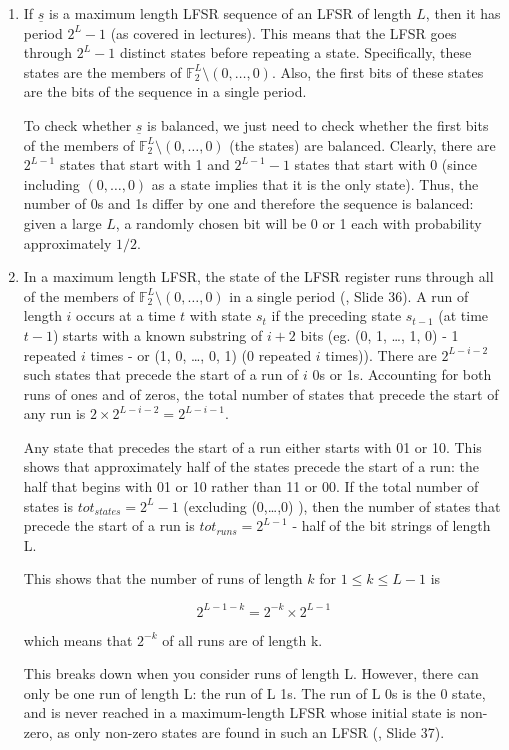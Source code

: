 \begin{enumerate}

\item If $\underline{s}$ is a maximum length LFSR sequence of an LFSR of length
$L$, then it has period $2^L-1$ (as covered in lectures). This means that the
LFSR goes through $2^L-1$ distinct states before repeating a state.
Specifically, these states are the members of $\mathbb{F}_2^L \setminus
{(0,\dots,0)}$. Also, the first bits of these states are the bits of the
sequence in a single period.

To check whether $\underline{s}$ is balanced, we just need to check whether the
first bits of the members of $\mathbb{F}_2^L \setminus {(0,\dots,0)}$ (the
states) are balanced. Clearly, there are $2^{L-1}$ states that start with 1 and
$2^{L-1}-1$ states that start with 0 (since including $(0,\dots,0)$ as a state
implies that it is the only state). Thus, the number of 0s and 1s differ by one
and therefore the sequence is balanced: given a large $L$, a randomly chosen bit
will be 0 or 1 each with probability approximately $1/2$.

\item In a maximum length LFSR, the state of the LFSR register runs through all
of the members of $\mathbb{F}_2^L \setminus {(0,\dots,0)}$ in a single period
(\cite{slides}, Slide 36). A run of length $i$ occurs at a time $t$ with state
$s_t$ if the preceding state $s_{t-1}$ (at time $t-1$) starts with a known
substring of $i+2$ bits (eg. (0, 1, \dots, 1, 0) - 1 repeated $i$ times - or (1,
0, \dots, 0, 1) (0 repeated $i$ times)). There are $2^{L-i-2}$ such states that
precede the start of a run of $i$ 0s or 1s. Accounting for both runs of ones and
of zeros, the total number of states that precede the start of any run is $2
\times 2^{L-i-2} = 2^{L-i-1}$.

Any state that precedes the start of a run either starts with 01 or 10. This
shows that approximately half of the states precede the start of a run: the half
that begins with 01 or 10 rather than 11 or 00. If the total number of states is
$tot_{states} = 2^L-1$ (excluding (0,\dots,0) ), then the number of states that
precede the start of a run is $tot_{runs} = 2^{L-1}$ - half of the bit strings
of length L.

This shows that the number of runs of length $k$ for $1 \le k \le L-1$ is

\[2^{L-1-k} = 2^{-k} \times 2^{L-1}\]

which means that $2^{-k}$ of all runs are of length k.

This breaks down when you consider runs of length L. However, there can only be
one run of length L: the run of L 1s. The run of L 0s is the 0 state, and is
never reached in a maximum-length LFSR whose initial state is non-zero, as only
non-zero states are found in such an LFSR (\cite{slides}, Slide 37).

\end{enumerate}
